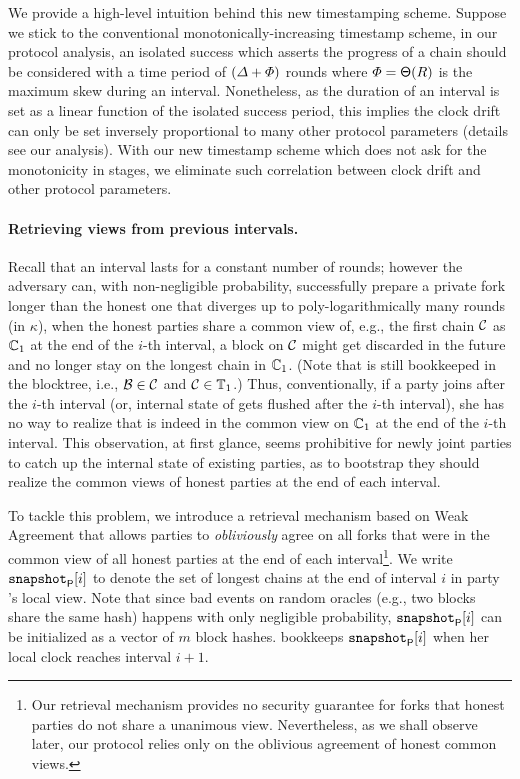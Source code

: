 We provide a high-level intuition behind this new timestamping scheme.
%
Suppose we stick to the conventional monotonically-increasing timestamp scheme, in our protocol analysis, an isolated success which asserts the progress of a chain should be considered with a time period of $(\varDelta + \varPhi)$ rounds where $\varPhi = \mathsf{\Theta}(R)$ is the maximum skew during an interval.
%
Nonetheless, as the duration of an interval is set as a linear function of the isolated success period, this implies the clock drift \clockDrift can only be set inversely proportional to many other protocol parameters (details see our analysis).
%
With our new timestamp scheme which does not ask for the monotonicity in stages, we eliminate such correlation between clock drift \clockDrift and other protocol parameters.

\paragraph{Retrieving views from previous intervals.}
%
Recall that an interval lasts for a constant number of rounds; however the adversary can, with non-negligible probability, successfully prepare a private fork longer than the honest one that diverges up to poly-logarithmically many rounds (in $\kappa$), when the honest parties share a common view of, e.g., the first chain $\mathcal{C}$ as $\mathbb{C}_1$ at the end of the $i$-th interval, a block \block on $\mathcal{C}$ might get discarded in the future and no longer stay on the longest chain in $\mathbb{C}_1$.
%
(Note that \block is still bookkeeped in the blocktree, i.e., $\mathcal{B} \in \mathcal{C}$ and $\mathcal{C} \in \mathbb{T}_1$.)
%
Thus, conventionally, if a party \party joins after the $i$-th interval (or, internal state of \party gets flushed after the $i$-th interval), she has no way to realize that \block is indeed in the common view on $\mathbb{C}_1$ at the end of the $i$-th interval.
%
This observation, at first glance, seems prohibitive for newly joint parties to catch up the internal state of existing parties, as to bootstrap they should realize the common views of honest parties at the end of each interval.

To tackle this problem, we introduce a retrieval mechanism based on Weak Agreement that allows parties to \emph{obliviously} agree on all forks that were in the common view of all honest parties at the end of each interval\footnote{Our retrieval mechanism provides no security guarantee for forks that honest parties do not share a unanimous view. Nevertheless, as we shall observe later, our protocol relies only on the oblivious agreement of honest common views.}.
%
We write $\mathtt{snapshot}_\mathsf{P}[i]$ to denote the set of longest chains at the end of interval $i$ in party \party's local view.
%
Note that since bad events on random oracles (e.g., two blocks share the same hash) happens with only negligible probability, $\mathtt{snapshot}_\mathsf{P}[i]$ can be initialized as a vector of $m$ block hashes.
%
\party bookkeeps $\mathtt{snapshot}_\mathsf{P}[i]$ when her local clock reaches interval $i + 1$.

